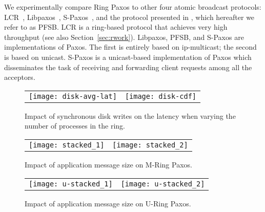 \documentclass[final,3p,times,twocolumn,authoryear]{elsarticle}
\begin{document}
We experimentally compare Ring Paxos to other four atomic broadcast protocols: LCR~\cite{Guerraoui2010}, 
Libpaxos~\cite{Libpaxos}, S-Paxos~\cite{spaxos}, and the protocol presented in \cite{KA08}, which hereafter we refer to as PFSB. 
LCR is a ring-based protocol that achieves very high throughput (see also Section~\ref{sec:rwork}). 
Libpaxos, PFSB, and S-Paxos are implementations of Paxos. The first is entirely based on ip-multicast; the second is based on unicast. 
S-Paxos is a unicast-based implementation of Paxos which disseminates the task of receiving and forwarding client requests among all the acceptors.

\begin{figure*}
  \begin{center}
    \begin{tabular}{c@{}c}
\texttt{[image: disk-avg-lat]} &
      \texttt{[image: disk-cdf]} \\
    \end{tabular}
    \vspace{-3mm}
    \caption{Impact of synchronous disk writes on the latency when varying the number of processes in the ring.}
\label{fig:disks}
  \end{center}
\end{figure*}

\begin{figure*}
  \begin{center}

   \begin{tabular}{c@{}c}
      \texttt{[image: stacked\_1]} &
      \texttt{[image: stacked\_2]}\\
    \end{tabular}
\caption{Impact of application message size on M-Ring Paxos.}
    \label{fig:multicast-msize}

  \end{center}
\end{figure*}

\begin{figure*}
  \begin{center}
    \begin{tabular}{c@{}c}
      \texttt{[image: u-stacked\_1]} &
      \texttt{[image: u-stacked\_2]}\\
   \end{tabular}
\caption{Impact of application message size on U-Ring Paxos.}
    \label{fig:unicast-msize}

  \end{center}
\end{figure*}
\end{document}
